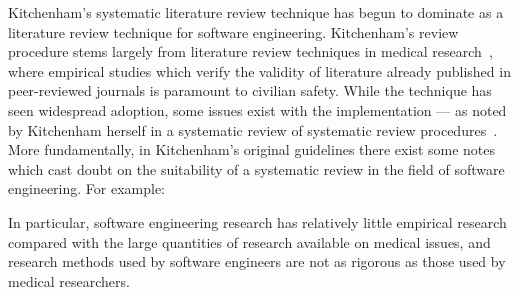 Kitchenham's systematic literature review technique has begun to dominate as a literature review technique for software engineering. Kitchenham's review procedure stems largely from literature review techniques in medical research~\citep{Kitchenham2004, khan2001undertaking}, where empirical studies which verify the validity of literature already published in peer-reviewed journals is paramount to civilian safety. While the technique has seen widespread adoption, some issues exist with the implementation --- as noted by Kitchenham herself in a systematic review of systematic review procedures~\citep{Kitchenham2013}. More fundamentally, in Kitchenham's original guidelines there exist some notes which cast doubt on the suitability of a systematic review in the field of software engineering. For example:
\begin{displayquote}
    In particular, software engineering research has relatively little empirical research compared with the large quantities of research available on medical issues, and research methods used by software engineers are not as rigorous as those used by medical researchers.
\end{displayquote}







